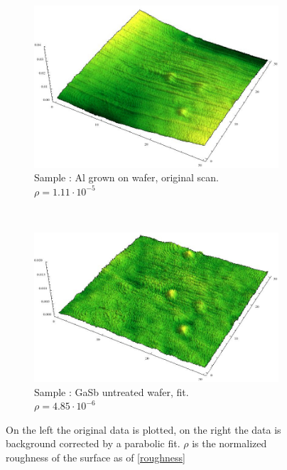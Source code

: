 \begin{figure}
    \begin{subfigure}{0.4\columnwidth}
         \includegraphics[width=\textwidth]{Bilder/s4_al_orig.jpg}
         \caption{Sample : Al grown on wafer, original scan.  $\rho = 
         1.11 \cdot 10^{-5}$}
        \label{s4_orig}
    \end{subfigure}
    ~
    \begin{subfigure}{0.4\columnwidth}
         \includegraphics[width=\textwidth]{Bilder/s4_al_f.jpg}
         \caption{Sample : GaSb untreated wafer, fit. \\  
         $\rho = 4.85 
         \cdot 10^{-6}$}
        \label{s3_flat}
    \end{subfigure}
\caption{On the left the original data is plotted, on the right the data is 
background corrected by a parabolic fit. $\rho$ is the normalized roughness of 
the surface as of \cref{roughness}}
\end{figure}



